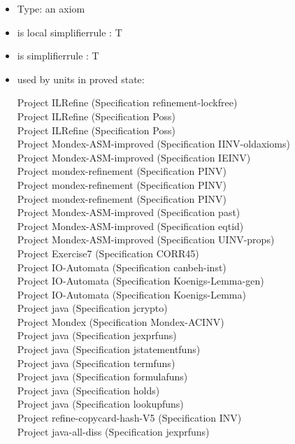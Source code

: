 \documentclass[a4paper]{article}
\begin{document}
\begin{itemize}

\item Type: an axiom

\item is local simplifierrule : T
\item is simplifierrule : T
\item used by units in proved state:

Project ILRefine (Specification refinement-lockfree) \\
Project ILRefine (Specification Poss) \\
Project ILRefine (Specification Poss) \\
Project Mondex-ASM-improved (Specification IINV-oldaxioms) \\
Project Mondex-ASM-improved (Specification IEINV) \\
Project mondex-refinement (Specification PINV) \\
Project mondex-refinement (Specification PINV) \\
Project mondex-refinement (Specification PINV) \\
Project Mondex-ASM-improved (Specification past) \\
Project Mondex-ASM-improved (Specification eqtid) \\
Project Mondex-ASM-improved (Specification UINV-props) \\
Project Exercise7 (Specification CORR45) \\
Project IO-Automata (Specification canbeh-inst) \\
Project IO-Automata (Specification Koenigs-Lemma-gen) \\
Project IO-Automata (Specification Koenigs-Lemma) \\
Project java (Specification jcrypto) \\
Project Mondex (Specification Mondex-ACINV) \\
Project java (Specification jexprfuns) \\
Project java (Specification jstatementfuns) \\
Project java (Specification termfuns) \\
Project java (Specification formulafuns) \\
Project java (Specification holds) \\
Project java (Specification lookupfuns) \\
Project refine-copycard-hash-V5 (Specification INV) \\
Project java-all-diss (Specification jexprfuns) \\

\end{itemize}
\end{document}

